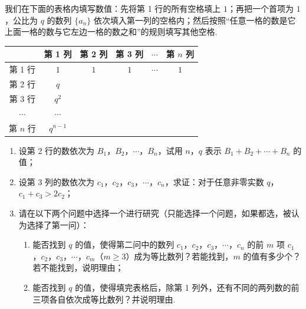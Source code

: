 \begin{problem}
我们在下面的表格内填写数值：先将第 1 行的所有空格填上 \(1\)；再把一个首项为 \(1\)，公比为 \(q\) 的数列 \(\{a_n\}\) 依次填入第一列的空格内；然后按照“任意一格的数是它上面一格的数与它左边一格的数之和”的规则填写其他空格.

\begin{center}
\begin{tabular}{|c|c|c|c|c|c|}
\hline
 & 第 1 列 & 第 2 列 & 第 3 列 & \(\cdots\) & 第 \(n\) 列 \\
\hline
第 1 行 & \(1\) & \(1\) & \(1\) & \(\cdots\) & \(1\) \\
\hline
第 2 行 & \(q\) &  &  &  &  \\
\hline
第 3 行 & \(q^2\) &  &  &  &  \\
\hline
\(\cdots\) & \(\cdots\) &  &  &  &  \\
\hline
第 \(n\) 行 & \(q^{n-1}\) &  &  &  &  \\
\hline
\end{tabular}
\end{center}

\begin{enumerate}
\item 设第 2 行的数依次为 \(B_1\)，\(B_2\)，\(\cdots\)，\(B_n\)，试用 \(n\)，\(q\) 表示 \(B_1+B_2+\cdots+B_n\) 的值；
\item 设第 3 列的数依次为 \(c_1\)，\(c_2\)，\(c_3\)，\(\cdots\)，\(c_n\)，求证：对于任意非零实数 \(q\)，\(c_1+c_3>2c_2\)；
\item 请在以下两个问题中选择一个进行研究（只能选择一个问题，如果都选，被认为选择了第一问）：
\begin{enumerate}
\item 能否找到 \(q\) 的值，使得第二问中的数列 \(c_1\)，\(c_2\)，\(c_3\)，\(\cdots\)，\(c_n\) 的前 \(m\) 项 \(c_1\)，\(c_2\)，\(c_3\)，\(\cdots\)，\(c_m\)（\(m\geqslant3\)）成为等比数列？若能找到，\(m\) 的值有多少个？若不能找到，说明理由；
\item 能否找到 \(q\) 的值，使得填完表格后，除第 1 列外，还有不同的两列数的前三项各自依次成等比数列？并说明理由.
\end{enumerate}
\end{enumerate}
\end{problem}

